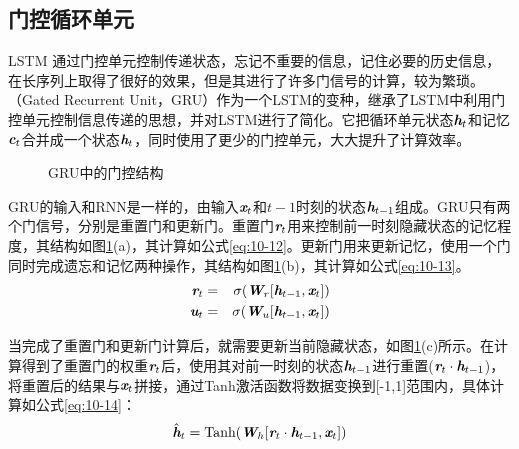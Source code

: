 \subsection{门控循环单元}

\parinterval LSTM 通过门控单元控制传递状态，忘记不重要的信息，记住必要的历史信息，在长序列上取得了很好的效果，但是其进行了许多门信号的计算，较为繁琐。{\small{}}（Gated Recurrent Unit，GRU）作为一个LSTM的变种，继承了LSTM中利用门控单元控制信息传递的思想，并对LSTM进行了简化。它把循环单元状态$\textbf{\em h}_t$和记忆$\textbf{\em c}_t$合并成一个状态$\textbf{\em h}_t$，同时使用了更少的门控单元，大大提升了计算效率。

\begin{figure}[htp]
\centering
\subfigure[重置门]{}
\subfigure[更新门]{}
\subfigure[隐藏状态更新]{}
\caption{GRU中的门控结构}
\label{fig:10-13}
\end{figure}

\parinterval GRU的输入和RNN是一样的，由输入$\textbf{\em x}_t$和$t-1$时刻的状态$\textbf{\em h}_{t-1}$组成。GRU只有两个门信号，分别是重置门和更新门。重置门$\textbf{\em r}_t$用来控制前一时刻隐藏状态的记忆程度，其结构如图\ref{fig:10-13}(a)，其计算如公式\eqref{eq:10-12}。更新门用来更新记忆，使用一个门同时完成遗忘和记忆两种操作，其结构如图\ref{fig:10-13}(b)，其计算如公式\eqref{eq:10-13}。
\begin{eqnarray}
\textbf{\em r}_t & = &\sigma (\textbf{\em W}_r [\textbf{\em h}_{t-1},\textbf{\em x}_{t}] ) \label{eq:10-12} \\
\textbf{\em u}_t & = & \sigma (\textbf{\em W}_u [\textbf{\em h}_{t-1},\textbf{\em x}_{t}]) \label{eq:10-13}
\end{eqnarray}

\parinterval 当完成了重置门和更新门计算后，就需要更新当前隐藏状态，如图\ref{fig:10-13}(c)所示。在计算得到了重置门的权重$\textbf{\em r}_t$后，使用其对前一时刻的状态$\textbf{\em h}_{t-1}$进行重置($\textbf{\em r}_t \cdot \textbf{\em h}_{t-1}$)，将重置后的结果与$\textbf{\em x}_t$拼接，通过Tanh激活函数将数据变换到[-1,1]范围内，具体计算如公式\eqref{eq:10-14}：
\vspace{-1em}
\begin{eqnarray}
\hat{\textbf{\em h}}_t = \textrm{Tanh} (\textbf{\em W}_h [\textbf{\em r}_t \cdot \textbf{\em h}_{t-1},\textbf{\em x}_{t}])
\label{eq:10-14}
\end{eqnarray}
\vspace{-1em}

